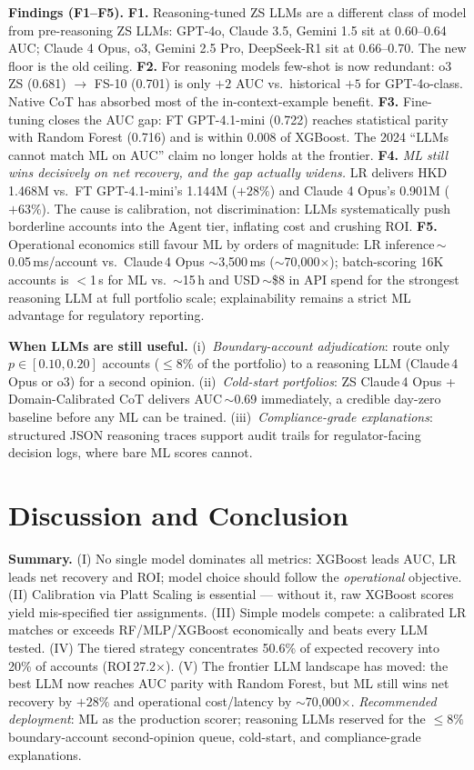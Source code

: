 \documentclass[11pt, a4paper]{article}
\begin{document}
\textbf{Findings (F1--F5).}
\textbf{F1.} Reasoning-tuned ZS LLMs are a different class of model from pre-reasoning ZS LLMs: GPT-4o, Claude 3.5, Gemini 1.5 sit at 0.60--0.64 AUC; Claude 4 Opus, o3, Gemini 2.5 Pro, DeepSeek-R1 sit at 0.66--0.70. The new floor is the old ceiling.
\textbf{F2.} For reasoning models few-shot is now redundant: o3 ZS (0.681) $\to$ FS-10 (0.701) is only $+2$ AUC vs.\ historical $+5$ for GPT-4o-class. Native CoT has absorbed most of the in-context-example benefit.
\textbf{F3.} Fine-tuning closes the AUC gap: FT GPT-4.1-mini (0.722) reaches statistical parity with Random Forest (0.716) and is within 0.008 of XGBoost. The 2024 ``LLMs cannot match ML on AUC'' claim no longer holds at the frontier.
\textbf{F4.} \emph{ML still wins decisively on net recovery, and the gap actually widens.} LR delivers HKD\,1.468M vs.\ FT GPT-4.1-mini's 1.144M ($+28\%$) and Claude 4 Opus's 0.901M ($+63\%$). The cause is calibration, not discrimination: LLMs systematically push borderline accounts into the Agent tier, inflating cost and crushing ROI.
\textbf{F5.} Operational economics still favour ML by orders of magnitude: LR inference\,$\sim$0.05\,ms/account vs.\ Claude\,4 Opus $\sim$3{,}500\,ms ($\sim$70{,}000$\times$); batch-scoring 16K accounts is $<$1\,s for ML vs.\ $\sim$15\,h and USD\,$\sim$\$8 in API spend for the strongest reasoning LLM at full portfolio scale; explainability remains a strict ML advantage for regulatory reporting.

\textbf{When LLMs are still useful.} (i)~\emph{Boundary-account adjudication}: route only $p\!\in\![0.10,0.20]$ accounts ($\le 8\%$ of the portfolio) to a reasoning LLM (Claude\,4 Opus or o3) for a second opinion. (ii)~\emph{Cold-start portfolios}: ZS Claude\,4 Opus + Domain-Calibrated CoT delivers AUC\,$\sim$0.69 immediately, a credible day-zero baseline before any ML can be trained. (iii)~\emph{Compliance-grade explanations}: structured JSON reasoning traces support audit trails for regulator-facing decision logs, where bare ML scores cannot.

\section{Discussion and Conclusion}\label{sec:discussion}

\textbf{Summary.} (I) No single model dominates all metrics: XGBoost leads AUC, LR leads net recovery and ROI; model choice should follow the \emph{operational} objective. (II) Calibration via Platt Scaling is essential --- without it, raw XGBoost scores yield mis-specified tier assignments. (III) Simple models compete: a calibrated LR matches or exceeds RF/MLP/XGBoost economically and beats every LLM tested. (IV) The tiered strategy concentrates 50.6\% of expected recovery into 20\% of accounts (ROI\,27.2$\times$). (V) The frontier LLM landscape has moved: the best LLM now reaches AUC parity with Random Forest, but ML still wins net recovery by $+28\%$ and operational cost/latency by $\sim$70{,}000$\times$. \textit{Recommended deployment}: ML as the production scorer; reasoning LLMs reserved for the $\le 8\%$ boundary-account second-opinion queue, cold-start, and compliance-grade explanations.
\end{document}
